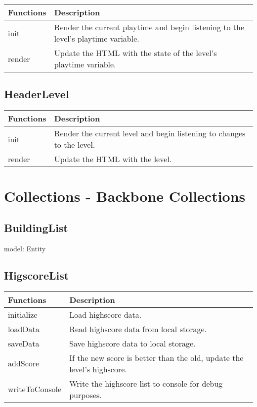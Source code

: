	\begin{table}[H]
	\begin{tabular}{p{4cm} | p{8cm} }
	\hline
	\rowcolor{gray}
	Functions & Description \\ \hline
	init & Render the current playtime and begin listening to the level's playtime variable. \\ \hline
	render & Update the HTML with the state of the level's playtime variable. \\ \hline
	\end{tabular}
	\end{table}

\subsection*{HeaderLevel}

	\begin{table}[H]
	\begin{tabular}{p{4cm} | p{8cm} }
	\hline
	\rowcolor{gray}
	Functions & Description \\ \hline
	init & Render the current level and begin listening to changes to the level. \\ \hline
	render & Update the HTML with the level.  \\ \hline
	\end{tabular}
	\end{table}

\clearpage

\section{Collections - Backbone Collections}
	
\subsection*{BuildingList}

	model: Entity

\subsection*{HigscoreList}

	\begin{table}[H]
	\begin{tabular}{p{4cm} | p{8cm} }
	\hline
	\rowcolor{gray}
	Functions & Description \\ \hline
	initialize & Load highscore data. \\ \hline
	loadData & Read highscore data from local storage. \\ \hline
	saveData & Save highscore data to local storage. \\ \hline
	addScore & If the new score is better than the old, update the level's highscore. \\ \hline
	writeToConsole & Write the highscore list to console for debug purposes. \\ \hline

	\end{tabular}
	\end{table}


